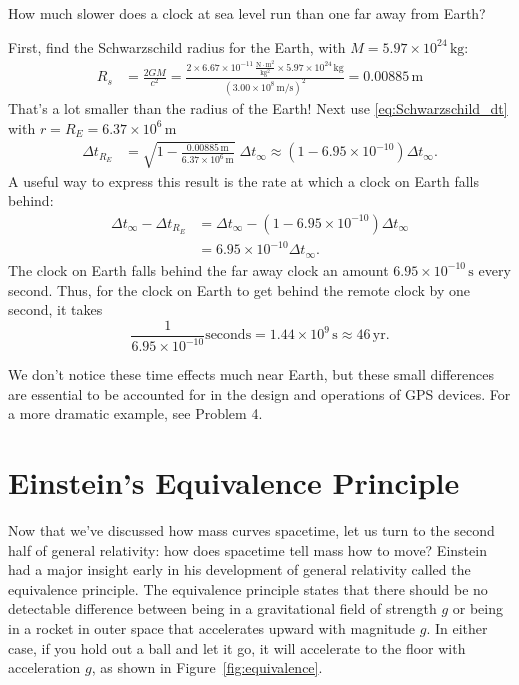 \begin{example}
How much slower does a clock at sea level run than one far away from
Earth?


\solution

First, find the Schwarzschild radius for the Earth, with $M=5.97\times
10^{24}\,\text{kg}$:
\begin{align}
  R_s &= \frac{2GM}{c^2} = \frac{2\times 6.67\times 10^{-11}\,\frac{\text{N$\cdot$m$^2$}}{\text{kg$^2$}} \times
    5.97\times 10^{24}\,\text{kg}}{(3.00\times 10^8\,\text{m/s})^2}
  = 0.00885\,\text{m}
\end{align}
That's a lot smaller than the radius of the Earth!
Next use \eqref{eq:Schwarzschild_dt} with $r=R_E = 6.37\times
10^{6}\,\text{m}$
\begin{align}
  \Delta t_{R_E} &=
  \sqrt{1-\frac{0.00885\,\text{m}}{6.37\times 10^{6}\,\text{m}}}\;\Delta t_\infty
   \approx (1 - 6.95\times 10^{-10}) \Delta t_\infty.
\end{align}
A useful way to express this result is the rate at which a clock on Earth
falls behind:
\begin{align}
  \Delta t_\infty - \Delta t_{R_E} &= \Delta t_\infty -
     (1 - 6.95\times 10^{-10}) \Delta t_\infty \\
   &= 6.95\times 10^{-10} \Delta t_\infty. 
\end{align}
The clock on Earth falls behind the far away clock an amount
$6.95\times 10^{-10}\,\text{s}$ every second.  Thus, for the clock on
Earth to get behind the remote clock by one second, it takes
\begin{equation}
\frac{1}{6.95\times 10^{-10}} \text{seconds} = 1.44\times
10^9\,\text{s}   \approx 46\,\text{yr}.
\end{equation}
\end{example}
We don't notice these time effects much near Earth, but these small
differences are essential to be accounted for in the design and
operations of GPS devices.  For a more dramatic example, see Problem
4.
 

\section{Einstein's Equivalence Principle}

Now that we've discussed how mass curves spacetime, let us turn to the
second half of general relativity: how does spacetime tell mass how to
move?  Einstein had a major insight early in his development of
general relativity called the equivalence principle.  The equivalence principle
states that there should be no detectable difference between being
in a gravitational field of strength $g$ or being in a rocket
in outer space that accelerates upward with magnitude $g$.  In
either case, if you hold out a ball and let it go, it will accelerate
to the floor with acceleration $g$, as shown in Figure~\ref{fig:equivalence}.

